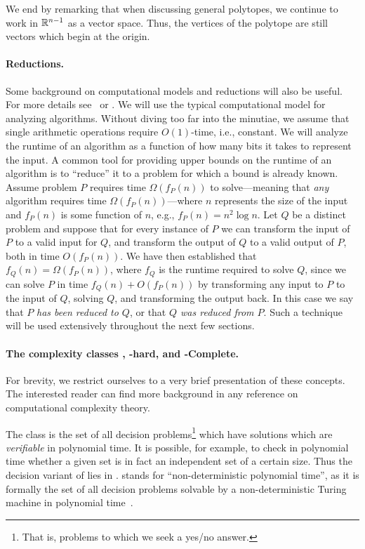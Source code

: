 We end by remarking that when discussing general  polytopes, we continue  to work  in $\mathbb{R}^{n-1}$ as a vector space. Thus,  the vertices of the polytope are still vectors which begin at the origin. 

\paragraph{Reductions.}
Some background on computational models and reductions will also be useful. For more details see~\cite{kleinberg2006algorithm} or \cite{knuth2011art}. We will use the typical computational model for analyzing algorithms. Without diving too far into the minutiae, we assume that single arithmetic operations require $O(1)$-time, i.e., constant. We will analyze the runtime of an algorithm as a function of how many bits it takes to represent the input. A common tool for providing upper bounds on the runtime of an algorithm is to ``reduce'' it to a problem for which a bound is already known. Assume problem $P$ requires time $\Omega(f_P(n))$ to solve---meaning that \emph{any} algorithm requires time $\Omega(f_P(n))$---where $n$ represents the size of the input and $f_P(n)$  is some function of $n$, e.g., $f_P(n) =  n^2\log n$. Let $Q$ be a distinct problem and suppose that for every instance of $P$ we can transform the input of $P$ to a valid input for $Q$, and transform the output of $Q$ to a valid output of $P$, both in time $O(f_P(n))$.  We have then established that $f_Q(n) = \Omega(f_P(n))$, where $f_Q$ is the runtime required to solve $Q$, since we can solve $P$ in time $f_Q(n) + O(f_P(n))$ by transforming any input to $P$ to the input of $Q$, solving $Q$, and transforming the output back. 
In  this case we say that $P$ \emph{has been reduced to  $Q$},  or that \emph{$Q$ was reduced from $P$}.
Such a technique will be used extensively throughout the next few sections. 

\paragraph{The complexity classes \NP, \NP-hard, and \NP-Complete.}
For brevity, we restrict ourselves to a very brief presentation of these concepts. The interested reader can find more background in any reference  on computational  complexity theory. 

The class \NP  is  the set of all decision problems\footnote{That is,  problems  to which we seek a yes/no answer.} which have solutions which are \emph{verifiable} in polynomial time. It is possible, for example, to check  in polynomial time whether  a given  set is in fact an independent set of a certain size. Thus the decision variant of \iset  lies in \NP. \NP stands for ``non-deterministic polynomial time'', as it is formally the set of all  decision problems solvable by a non-deterministic Turing  machine in polynomial time~\cite{papadimitriou2003computational}. 

